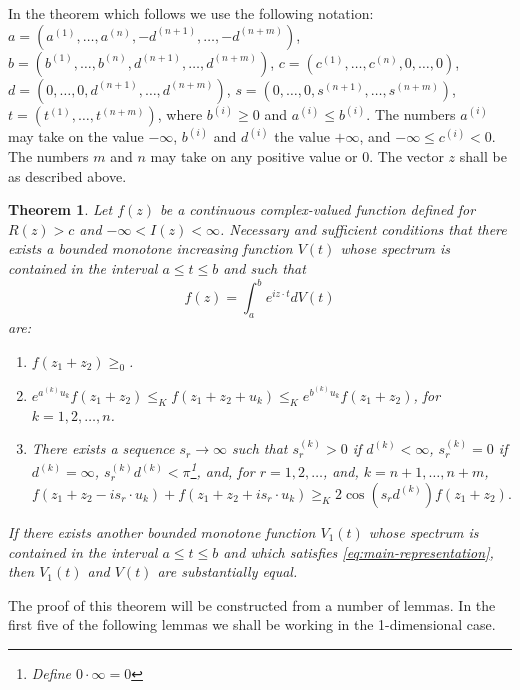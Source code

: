 \documentclass{article}
\newtheorem{theorem}{Theorem}
\begin{document}
In the theorem which follows we use the following notation: $a = (a^{(1)}, \ldots, a^{(n)}, -d^{(n+1)}, \ldots, -d^{(n+m)})$, $b = (b^{(1)}, \ldots, b^{(n)}, d^{(n+1)}, \ldots, d^{(n+m)})$, $c = (c^{(1)}, \ldots, c^{(n)}, 0, \ldots, 0)$, $d = (0, \ldots, 0, d^{(n+1)}, \ldots, d^{(n+m)})$, $s = (0, \ldots, 0, s^{(n+1)}, \ldots, s^{(n+m)})$, $t = (t^{(1)}, \ldots, t^{(n+m)})$, where $b^{(i)} \geq 0$ and $a^{(i)} \leq b^{(i)}$. The numbers $a^{(i)}$ may take on the value $-\infty$, $b^{(i)}$ and $d^{(i)}$ the value $+\infty$, and $-\infty \leq c^{(i)} < 0$. The numbers $m$ and $n$ may take on any positive value or 0. The vector $z$ shall be as described above.

\begin{theorem}
\label{thm:main}
Let $f(z)$ be a continuous complex-valued function defined for $R(z) > c$ and $-\infty < I(z) < \infty$. Necessary and sufficient conditions that there exists a bounded monotone increasing function $V(t)$ whose spectrum is contained in the interval $a \leq t \leq b$ and such that
\begin{equation}
f(z) = \int_a^b e^{iz \cdot t} dV(t)
\label{eq:main-representation}
\end{equation}
are:
\begin{enumerate}
\item $f(z_1 + z_2) \geq_0$.
\item $e^{a^{(k)} u_k} f(z_1 + z_2) \leq_K f(z_1 + z_2 + u_k) \leq_K e^{b^{(k)} u_k} f(z_1 + z_2)$, for $k = 1, 2, \ldots, n$.
\item There exists a sequence $s_r \to \infty$ such that $s_r^{(k)} > 0$ if $d^{(k)} < \infty$, $s_r^{(k)} = 0$ if $d^{(k)} = \infty$, $s_r^{(k)} d^{(k)} < \pi$\footnote{Define $0 \cdot \infty = 0$}, and, for $r = 1, 2, \ldots$, and, $k = n+1, \ldots, n+m$,
\begin{equation}
f(z_1 + z_2 - is_r \cdot u_k) + f(z_1 + z_2 + is_r \cdot u_k) \geq_K 2\cos(s_r d^{(k)}) f(z_1 + z_2).
\label{eq:cosine-condition}
\end{equation}
\end{enumerate}

If there exists another bounded monotone function $V_1(t)$ whose spectrum is contained in the interval $a \leq t \leq b$ and which satisfies \eqref{eq:main-representation}, then $V_1(t)$ and $V(t)$ are substantially equal.
\end{theorem}

The proof of this theorem will be constructed from a number of lemmas. In the first five of the following lemmas we shall be working in the 1-dimensional case.
\end{document}
